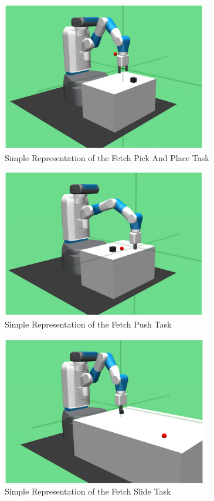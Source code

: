 \begin{figure}[h!]
    \centering
    \includegraphics[width=0.8\textwidth]{images/FPAP.png}
    \caption{Simple Representation of the Fetch Pick And Place Task}
    \label{fig:FPAP}
\end{figure}

\begin{figure}[h!]
    \centering
    \includegraphics[width=0.8\textwidth]{images/FP.png}
    \caption{Simple Representation of the Fetch Push Task}
    \label{fig:FP}
\end{figure}

\begin{figure}[h!]
    \centering
    \includegraphics[width=0.8\textwidth]{images/FS.png}
    \caption{Simple Representation of the Fetch Slide Task}
    \label{fig:FS}
\end{figure}

